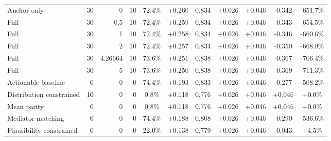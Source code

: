 \begin{table}[htbp]
\begin{tabular}{lrrrccccccc}
Anchor only & 30 & 0 & 10 & 72.4\% & +0.260 & 0.834 & +0.026 & +0.046 & -0.342 & -651.7\% \\
Full & 30 & 0.5 & 10 & 72.4\% & +0.259 & 0.834 & +0.026 & +0.046 & -0.343 & -654.5\% \\
Full & 30 & 1 & 10 & 72.4\% & +0.258 & 0.834 & +0.026 & +0.046 & -0.346 & -660.6\% \\
Full & 30 & 2 & 10 & 72.4\% & +0.257 & 0.834 & +0.026 & +0.046 & -0.350 & -668.0\% \\
Full & 30 & 4.26664 & 10 & 73.6\% & +0.251 & 0.838 & +0.026 & +0.046 & -0.367 & -706.4\% \\
Full & 30 & 5 & 10 & 73.6\% & +0.250 & 0.838 & +0.026 & +0.046 & -0.369 & -711.3\% \\
Actionable baseline & 0 & 0 & 0 & 74.4\% & +0.193 & 0.833 & +0.026 & +0.046 & -0.277 & -508.2\% \\
Distribution constrained & 10 & 0 & 0 & 0.8\% & +0.118 & 0.776 & +0.026 & +0.046 & +0.046 & +0.0\% \\
Mean parity & 0 & 0 & 0 & 0.8\% & +0.118 & 0.776 & +0.026 & +0.046 & +0.046 & +0.0\% \\
Mediator matching & 0 & 0 & 0 & 74.4\% & +0.188 & 0.808 & +0.026 & +0.046 & -0.290 & -536.6\% \\
Plausibility constrained & 0 & 0 & 0 & 22.0\% & +0.138 & 0.779 & +0.026 & +0.046 & -0.043 & +4.5\% \\
\bottomrule
\end{tabular}
\end{table}
